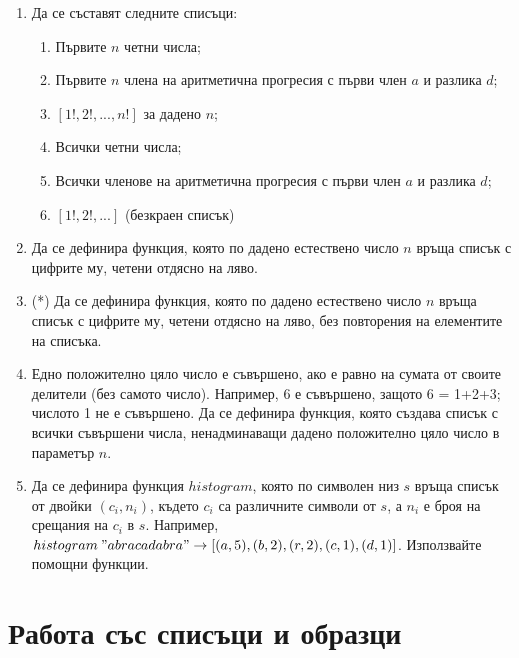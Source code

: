 \begin{enumerate}[]

  \item Да се съставят следните списъци:
	\renewcommand{\theenumii}{\Alph{enumii}}

	\begin{enumerate}[label=\alph*)]%
			 \item Първите $n$ четни числа;
			 \item Първите $n$ члена на аритметична прогресия с първи член $a$ и разлика $d$;
			 \item $[1!, 2!, ..., n!]$ за дадено $n$;
			 \item Всички четни числа;
			 \item Всички членове на аритметична прогресия с първи член $a$ и разлика $d$;
			 \item $[1!, 2!, ...]$ (безкраен списък)
  \end{enumerate}

  \item Да се дефинира функция, която по дадено естествено число $n$ връща списък с цифрите му, четени отдясно на ляво.

  \item(*) Да се дефинира функция, която по дадено естествено число $n$ връща списък с цифрите му, четени отдясно на ляво, без повторения на елементите на списъка.

  \item Едно положително цяло число е съвършено, ако е равно на сумата от своите делители (без самото число). Например, 6 е съвършено, защото 6 = 1+2+3; числото 1 не е съвършено. Да се дефинира функция, която създава списък с  всички съвършени числа, ненадминаващи дадено положително цяло число в параметър $n$.
  
  \item Да се дефинира функция $histogram$, която по символен низ $s$ връща списък от двойки $(c_i,n_i)$, където $c_i$ са различните символи от $s$, а $n_i$ е броя на срещания на $c_i$ в $s$. Например, $histogram \: "abracadabra" \rightarrow [(a,5), (b,2), (r,2), (c,1), (d,1)]$. Използвайте помощни функции.
\end{enumerate}

\section {Работа със списъци и образци}

